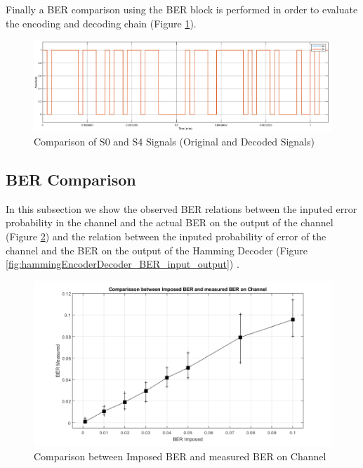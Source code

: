 \begin{refsection}
Finally a BER comparison using the BER block is performed in order to evaluate the encoding and decoding chain (Figure \ref{fig:hammingEncoderDecoder_S0_S4}).

\begin{figure}[h!]
	\centering
	\includegraphics[width=.9\linewidth]{./sdf/eit_25828_hamming_channel_encoder_decoder/images/S0_S4.png}
	\vspace{-3mm}
	\caption{Comparison of S0 and S4 Signals (Original and Decoded Signals)}
	\label{fig:hammingEncoderDecoder_S0_S4}
	\vspace{-3mm}
\end{figure}

\vspace{-3mm}

\subsection*{BER Comparison}

\vspace{-1mm}

In this subsection we show the observed BER relations between the inputed error probability in the channel and the actual BER on the output of the channel (Figure \ref{fig:hammingEncoderDecoder_BER_input_output_channel}) and the relation between the inputed probability of error of the channel and the BER on the output of the Hamming Decoder (Figure \ref{fig:hammingEncoderDecoder_BER_input_output}) .

\begin{figure}[h!]
	\vspace{-4mm}
	\centering
	\includegraphics[width=.9\linewidth]{./sdf/eit_25828_hamming_channel_encoder_decoder/images/BER_1.png}
	\vspace{-5mm}
	\caption{Comparison between Imposed BER and measured BER on Channel}
	\label{fig:hammingEncoderDecoder_BER_input_output_channel}
\end{figure}


\end{refsection}
